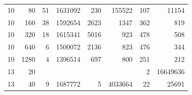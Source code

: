 \begin{table}[p]
\begin{minipage}[c]{0.49\textwidth}
\begin{tabular}{|rr|rr|rr|rr|}
\num{10} &   \num{80} & \num{51} & \num{1631092} &  \num{230} &  \num{155522} & \num{107} &   \num{11154} \\
\num{10} &  \num{160} & \num{38} & \num{1592654} & \num{2623} &    \num{1347} & \num{362} &     \num{819} \\
\num{10} &  \num{320} & \num{18} & \num{1615341} & \num{5016} &     \num{923} & \num{478} &     \num{508} \\
\num{10} &  \num{640} &  \num{6} & \num{1500072} & \num{2136} &     \num{823} & \num{476} &     \num{344} \\
\num{10} & \num{1280} &  \num{4} & \num{1396514} &  \num{697} &     \num{800} & \num{251} &     \num{212} \\
\hline
\num{13} &   \num{20} &          &               &            &               &   \num{2} & \num{16649636} \\
\num{13} &   \num{40} &  \num{9} & \num{1687772} &    \num{5} & \num{4033664} &  \num{22} &    \num{25691} \\

\end{tabular}
\end{minipage}
\end{table}
